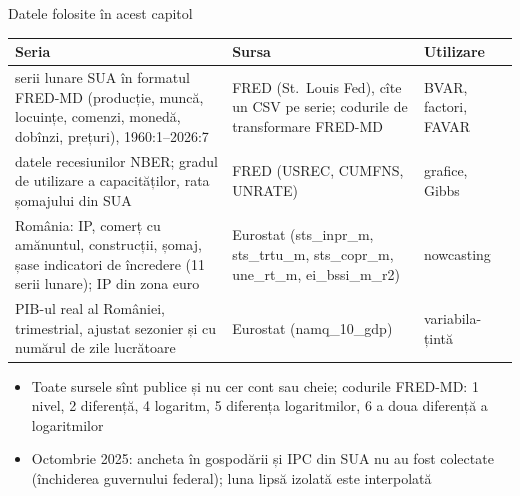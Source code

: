 \begin{frame}{Datele folosite în acest capitol}
\itemsize{\footnotesize}
\begin{center}
\scriptsize
\begin{tabular}{>{\raggedright\arraybackslash}p{5.0cm}>{\raggedright\arraybackslash}p{4.6cm}>{\raggedright\arraybackslash}p{2.4cm}}
\toprule
\textbf{Seria} & \textbf{Sursa} & \textbf{Utilizare} \\
\midrule
117 serii lunare SUA în formatul FRED-MD (producție, muncă, locuințe, comenzi, monedă, dobînzi, prețuri), 1960:1--2026:7 & FRED (St.~Louis Fed), cîte un CSV pe serie; codurile de transformare FRED-MD {} & BVAR, factori, FAVAR \\
datele recesiunilor NBER; gradul de utilizare a capacităților, rata șomajului din SUA & FRED (USREC, CUMFNS, UNRATE) & grafice, Gibbs \\
România: IP, comerț cu amănuntul, construcții, șomaj, șase indicatori de încredere (11 serii lunare); IP din zona euro & Eurostat (sts\_inpr\_m, sts\_trtu\_m, sts\_copr\_m, une\_rt\_m, ei\_bssi\_m\_r2) & nowcasting \\
PIB-ul real al României, trimestrial, ajustat sezonier și cu numărul de zile lucrătoare & Eurostat (namq\_10\_gdp) & variabila-țintă \\
\bottomrule
\end{tabular}
\end{center}
\begin{itemize}
    \item Toate sursele sînt publice și nu cer cont sau cheie; codurile FRED-MD: 1 nivel, 2 diferență, 4 logaritm, 5 diferența logaritmilor, 6 a doua diferență a logaritmilor
    \item Octombrie 2025: ancheta în gospodării și IPC din SUA nu au fost colectate (închiderea guvernului federal); luna lipsă izolată este interpolată
\end{itemize}
\end{frame}

